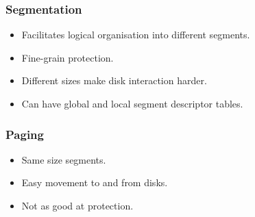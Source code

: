 \documentclass[8pt]{extarticle}
\begin{document}
\begin{multicols}{3}
\subsubsection{Segmentation}
\begin{itemize}
  \item Facilitates logical organisation into different segments.
  \item Fine-grain protection.
  \item Different sizes make disk interaction harder.
  \item Can have global and local segment descriptor tables.
\end{itemize}

\subsubsection{Paging}
\begin{itemize}
  \item Same size segments.
  \item Easy movement to and from disks.
  \item Not as good at protection.
\end{itemize}

\end{multicols}
\end{document}
